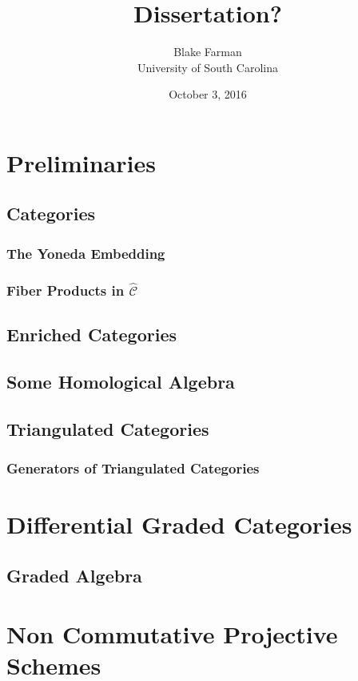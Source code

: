 \documentclass[10pt]{book}
\author{Blake Farman\\University of South Carolina}
\title{Dissertation?}
\date{October 3, 2016}
\begin{document}

\tableofcontents

\newtheorem{thm}{Theorem}[section]
\newtheorem{lem}[thm]{Lemma}
\newtheorem{cor}[thm]{Corollary}
\newtheorem{prop}[thm]{Proposition}

\theoremstyle{definition}
\newtheorem{defn}[thm]{Definition}
\newtheorem{rmk}[thm]{Remark}
\newtheorem{eg}[thm]{Example}

\chapter{Preliminaries}
\section{Categories}

\subsection{The Yoneda Embedding}
\subsection{Fiber Products in $\hat{\mathscr{C}}$} %

\section{Enriched Categories}



\section{Some Homological Algebra}

\section{Triangulated Categories}


\subsection{Generators of Triangulated Categories}

\chapter{Differential Graded Categories}

\section{Graded Algebra}

\chapter{Non Commutative Projective Schemes}


\end{document}

